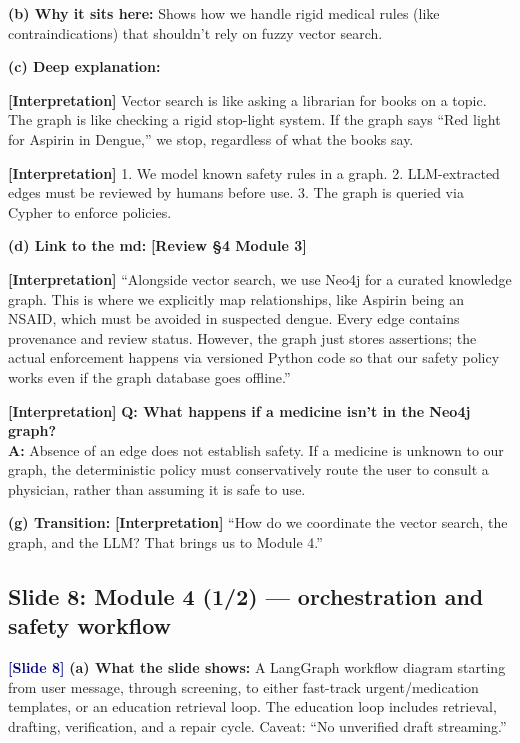 \documentclass[11pt,a4paper]{article}
\newcommand{\origintag}[2]{\textcolor{#1}{\small\textbf{[#2]}}}
\begin{document}
\textbf{(b) Why it sits here:} Shows how we handle rigid medical rules (like contraindications) that shouldn't rely on fuzzy vector search.

\textbf{(c) Deep explanation:}
\begin{analogy}
\origintag{slate}{Interpretation} Vector search is like asking a librarian for books on a topic. The graph is like checking a rigid stop-light system. If the graph says ``Red light for Aspirin in Dengue,'' we stop, regardless of what the books say.
\end{analogy}
\origintag{slate}{Interpretation} 1. We model known safety rules in a graph. 2. LLM-extracted edges must be reviewed by humans before use. 3. The graph is queried via Cypher to enforce policies.

\textbf{(d) Link to the md:} \origintag{amber}{Review \S4 Module 3}

\begin{sayit}
\origintag{slate}{Interpretation} ``Alongside vector search, we use Neo4j for a curated knowledge graph. This is where we explicitly map relationships, like Aspirin being an NSAID, which must be avoided in suspected dengue. Every edge contains provenance and review status. However, the graph just stores assertions; the actual enforcement happens via versioned Python code so that our safety policy works even if the graph database goes offline.''
\end{sayit}

\begin{qa}
\origintag{slate}{Interpretation} \textbf{Q: What happens if a medicine isn't in the Neo4j graph?} \\
\textbf{A:} Absence of an edge does not establish safety. If a medicine is unknown to our graph, the deterministic policy must conservatively route the user to consult a physician, rather than assuming it is safe to use.
\end{qa}
\textbf{(g) Transition:} \origintag{slate}{Interpretation} ``How do we coordinate the vector search, the graph, and the LLM? That brings us to Module 4.''

\subsection{Slide 8: Module 4 (1/2) --- orchestration and safety workflow}
\origintag{navy}{Slide 8}
\textbf{(a) What the slide shows:} A LangGraph workflow diagram starting from user message, through screening, to either fast-track urgent/medication templates, or an education retrieval loop. The education loop includes retrieval, drafting, verification, and a repair cycle. Caveat: ``No unverified draft streaming.''
\end{document}
